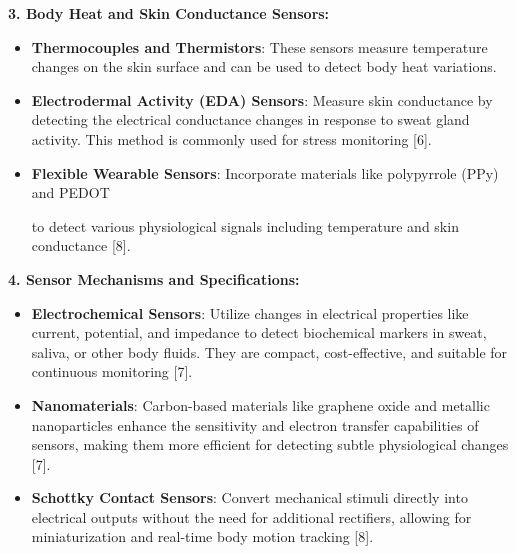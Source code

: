 \documentclass{article}
\begin{document}
\textbf{3. Body Heat and Skin Conductance Sensors:}

\begin{itemize}
    \item \textbf{Thermocouples and Thermistors}: These sensors measure temperature changes on the skin surface and can be used to detect body heat variations.
    \item \textbf{Electrodermal Activity (EDA) Sensors}: Measure skin conductance by detecting the electrical conductance changes in response to sweat gland activity. This method is commonly used for stress monitoring [6].
    \item \textbf{Flexible Wearable Sensors}: Incorporate materials like polypyrrole (PPy) and PEDOT

to detect various physiological signals including temperature and skin conductance [8].
\end{itemize}

\textbf{4. Sensor Mechanisms and Specifications:}

\begin{itemize}
    \item \textbf{Electrochemical Sensors}: Utilize changes in electrical properties like current, potential, and impedance to detect biochemical markers in sweat, saliva, or other body fluids. They are compact, cost-effective, and suitable for continuous monitoring [7].
    \item \textbf{Nanomaterials}: Carbon-based materials like graphene oxide and metallic nanoparticles enhance the sensitivity and electron transfer capabilities of sensors, making them more efficient for detecting subtle physiological changes [7].
    \item \textbf{Schottky Contact Sensors}: Convert mechanical stimuli directly into electrical outputs without the need for additional rectifiers, allowing for miniaturization and real-time body motion tracking [8].
\end{itemize}
 
\end{document}
